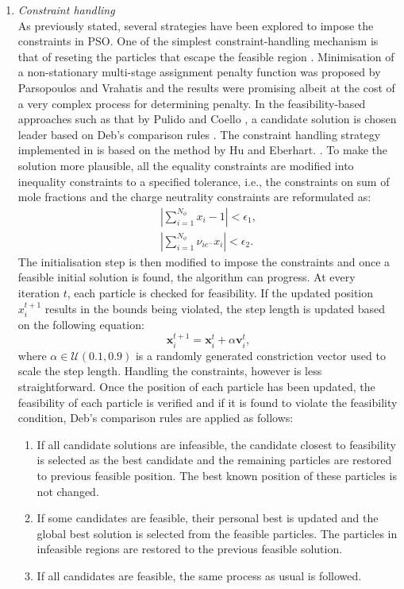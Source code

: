 	\begin{enumerate}
		\item \emph{Constraint handling}\\
			As previously stated, several strategies have been explored to impose the constraints in PSO. One of the simplest constraint-handling mechanism is that of reseting the particles that escape the feasible region \cite{Hu:2002aa,Guo:2004aa,Sun:2009aa}. Minimisation of a non-stationary multi-stage assignment penalty function was proposed by Parsopoulos and Vrahatis \cite{Parsopoulos:2005aa} and the results were promising albeit at the cost of a very complex process for determining penalty. In the feasibility-based approaches such as that by Pulido and Coello \cite{Pulido:2004aa}, a candidate solution is chosen leader based on Deb's comparison rules \cite{Deb:2000aa}. The constraint handling strategy implemented in {\GEM} is based on the method by Hu and Eberhart. \cite{Hu:2002aa}. To make the solution more plausible, all the equality constraints are modified into inequality constraints to a specified tolerance, i.e., the constraints on sum of mole fractions and the charge neutrality constraints are reformulated as:
			\begin{gather}
				\left | \sum_{i=1}^{N_\phi} x_i - 1 \right | <  \epsilon_1,\\
				\left | \sum_{i=1}^{N_\phi} \nu_{i{e^-}} x_i \right | < \epsilon_2.
			\end{gather} 
			The initialisation step is then modified to impose the constraints and once a feasible initial solution is found, the algorithm can progress. At every iteration $t$, each particle is checked for feasibility. If the updated position $x_i^{t+1}$ results in the bounds being violated, the step length is updated based on the following equation:
			\begin{equation}  \label{eq:PSO_pos_alpha}
				\mathbf{x}_i^{t+1} = \mathbf{x}_i^{t} + \alpha \mathbf{v}_i^{t},
			\end{equation}
			where $\alpha \in \mathcal{U} (0.1, 0.9)$ is a randomly generated constriction vector used to scale the step length. Handling the constraints, however is less straightforward. Once the position of each particle has been updated, the feasibility of each particle is verified and if it is found to violate the feasibility condition, Deb's comparison rules \cite{Deb:2000aa} are applied as follows:
			\begin{enumerate}
				\item	If all candidate solutions are infeasible, the candidate closest to feasibility is selected as the best candidate and the remaining particles are restored to previous feasible position. The best known position of these particles is not changed.
				\item If some candidates are feasible, their personal best is updated and the global best solution is selected from the feasible particles. The particles in infeasible regions are restored to the previous feasible solution.
				\item If all candidates are feasible, the same process as usual is followed.
			\end{enumerate}
			

\end{enumerate}
